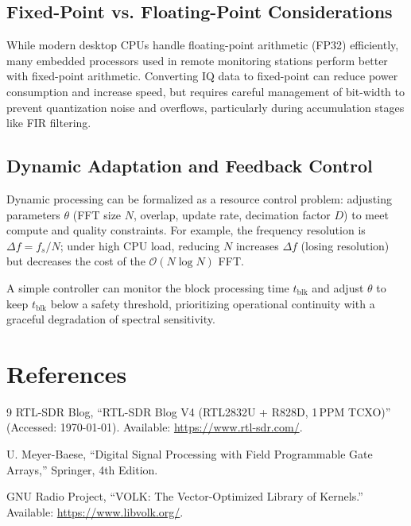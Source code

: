 \documentclass[11pt]{article}
\begin{document}
\subsection{Fixed-Point vs. Floating-Point Considerations}
While modern desktop CPUs handle floating-point arithmetic (FP32) efficiently, many embedded processors used in remote monitoring stations perform better with fixed-point arithmetic. Converting IQ data to fixed-point can reduce power consumption and increase speed, but requires careful management of bit-width to prevent quantization noise and overflows, particularly during accumulation stages like FIR filtering.

\subsection{Dynamic Adaptation and Feedback Control}
Dynamic processing can be formalized as a resource control problem: adjusting parameters $\theta$ (FFT size $N$, overlap, update rate, decimation factor $D$) to meet compute and quality constraints. For example, the frequency resolution is $\Delta f = f_s/N$; under high CPU load, reducing $N$ increases $\Delta f$ (losing resolution) but decreases the cost of the $\mathcal{O}(N \log N)$ FFT.

A simple controller can monitor the block processing time $t_{\text{blk}}$ and adjust $\theta$ to keep $t_{\text{blk}}$ below a safety threshold, prioritizing operational continuity with a graceful degradation of spectral sensitivity.

\section{References}
\begin{thebibliography}{9}
RTL-SDR Blog, ``RTL-SDR Blog V4 (RTL2832U + R828D, 1\,PPM TCXO)'' (Accessed: \today). Available: \url{https://www.rtl-sdr.com/}.

U. Meyer-Baese, ``Digital Signal Processing with Field Programmable Gate Arrays,'' Springer, 4th Edition.

GNU Radio Project, ``VOLK: The Vector-Optimized Library of Kernels.'' Available: \url{https://www.libvolk.org/}.
\end{thebibliography}
\end{document}
